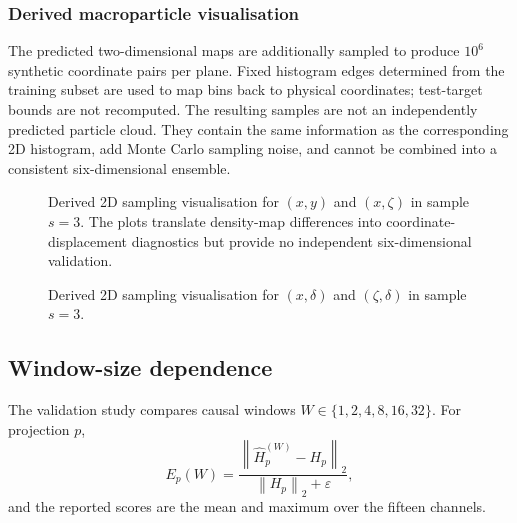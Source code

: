\subsubsection{Derived macroparticle visualisation}

The predicted two-dimensional maps are additionally sampled to produce $10^6$ synthetic coordinate pairs per plane. Fixed histogram edges determined from the training subset are used to map bins back to physical coordinates; test-target bounds are not recomputed. The resulting samples are not an independently predicted particle cloud. They contain the same information as the corresponding 2D histogram, add Monte Carlo sampling noise, and cannot be combined into a consistent six-dimensional ensemble.

\begin{figure}[p]
    \centering
    \vspace{0.7em}
    \caption{Derived 2D sampling visualisation for $(x,y)$ and $(x,\zeta)$ in sample $s=3$. The plots translate density-map differences into coordinate-displacement diagnostics but provide no independent six-dimensional validation.}
    \label{fig:sampling_comparison_xy_xzeta}
\end{figure}

\begin{figure}[p]
    \centering
    \vspace{0.7em}
    \caption{Derived 2D sampling visualisation for $(x,\delta)$ and $(\zeta,\delta)$ in sample $s=3$.}
    \label{fig:sampling_comparison_xdelta_longitudinal}
\end{figure}

\subsection{Window-size dependence}
\label{subsec:results_window_study}

The validation study compares causal windows $W\in\{1,2,4,8,16,32\}$. For projection $p$,
\begin{equation}
    E_p(W)
    =
    \frac{\left\|\widehat{H}_{p}^{(W)}-H_p\right\|_2}
    {\left\|H_p\right\|_2+\varepsilon},
\end{equation}
and the reported scores are the mean and maximum over the fifteen channels.

